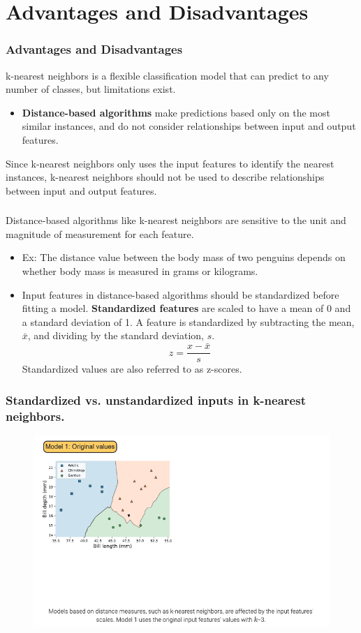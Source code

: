 \documentclass[8pt,dvipsnames]{beamer}
\begin{document}
\section{Advantages and Disadvantages}
\begin{frame}
	\frametitle{Advantages and Disadvantages}
	k-nearest neighbors is a flexible classification model that can predict to any number of classes, but limitations exist.
	\begin{itemize}
		\item 	\textbf{Distance-based algorithms} make predictions based only on the most similar instances, and do not consider relationships between input and output features.
	\end{itemize}
	Since k-nearest neighbors only uses the input features to identify the nearest instances, k-nearest neighbors should not be used to
	describe relationships between input and output features.
\end{frame}

\begin{frame}
	\frametitle{}

	Distance-based algorithms like k-nearest neighbors are sensitive to the unit and magnitude of measurement for each feature.
	\begin{itemize}
		\item Ex: The distance value between the body mass of two penguins depends on whether body mass is measured in grams or kilograms.
		\item Input features in distance-based algorithms should be standardized before fitting a model. \textbf{Standardized features} are scaled to have a mean of 0 and a standard deviation of 1. A feature is standardized by subtracting the mean, \(\bar{x}\), and dividing by the standard deviation, \(s\).
		      $$
			      z=\frac{x-\bar{x}}{s}
		      $$
		      Standardized values are also referred to as z-scores.
	\end{itemize}
\end{frame}

\begin{frame}
	\frametitle{Standardized vs. unstandardized inputs in k-nearest neighbors.}
	\begin{figure}[ht]
		\centering
		\includegraphics[width=\linewidth]{imgs/knn_38.png}
	\end{figure}
\end{frame}
\end{document}
